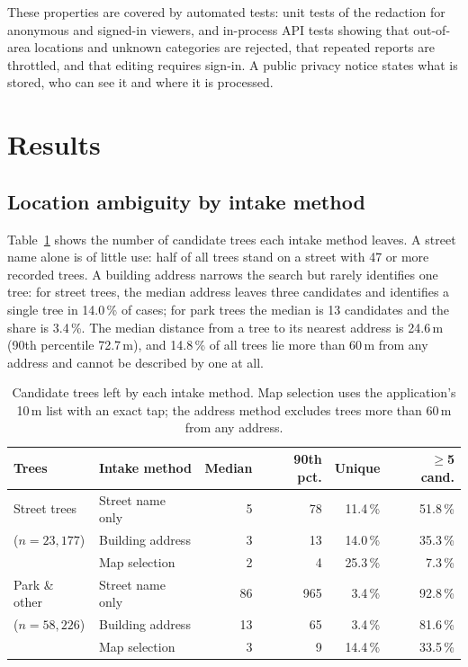 \documentclass[11pt,a4paper]{article}
\begin{document}
These properties are covered by automated tests: unit tests of the redaction for anonymous and signed-in viewers, and in-process API tests showing that out-of-area locations and unknown categories are rejected, that repeated reports are throttled, and that editing requires sign-in. A public privacy notice states what is stored, who can see it and where it is processed.

\section{Results}
\label{sec:results}

\subsection{Location ambiguity by intake method}

Table~\ref{tab:intake} shows the number of candidate trees each intake method leaves. A street name alone is of little use: half of all trees stand on a street with 47 or more recorded trees. A building address narrows the search but rarely identifies one tree: for street trees, the median address leaves three candidates and identifies a single tree in 14.0\,\% of cases; for park trees the median is 13 candidates and the share is 3.4\,\%. The median distance from a tree to its nearest address is 24.6\,m (90th percentile 72.7\,m), and 14.8\,\% of all trees lie more than 60\,m from any address and cannot be described by one at all.

\begin{table}[htbp]
\centering
\caption{Candidate trees left by each intake method. Map selection uses the application's 10\,m list with an exact tap; the address method excludes trees more than 60\,m from any address.}
\label{tab:intake}
\begin{tabular}{@{}llrrrr@{}}
\toprule
\textbf{Trees} & \textbf{Intake method} & \textbf{Median} & \textbf{90th pct.} & \textbf{Unique} & \textbf{$\geq$5 cand.} \\
\midrule
Street trees  & Street name only  & 5  & 78  & 11.4\,\% & 51.8\,\% \\
($n=23{,}177$) & Building address & 3  & 13  & 14.0\,\% & 35.3\,\% \\
              & Map selection     & 2  & 4   & 25.3\,\% & 7.3\,\% \\
\addlinespace
Park \& other & Street name only  & 86 & 965 & 3.4\,\%  & 92.8\,\% \\
($n=58{,}226$) & Building address & 13 & 65  & 3.4\,\%  & 81.6\,\% \\
              & Map selection     & 3  & 9   & 14.4\,\% & 33.5\,\% \\
\bottomrule
\end{tabular}
\end{table}
\end{document}
